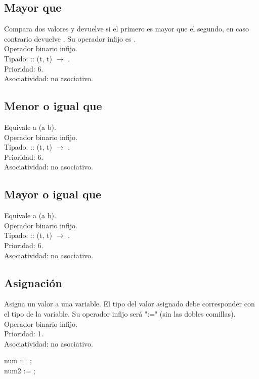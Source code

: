 \subsection*{Mayor que}
Compara dos valores y devuelve  si el primero es mayor que el segundo, en caso contrario devuelve . Su operador infijo es \Gt.
\\Operador binario infijo.
\\Tipado: \Gt :: (t, t) $\rightarrow$ \Boolean. \\Prioridad: 6.
\\Asociatividad: no asociativo.

\subsection*{Menor o igual que}
Equivale a \Not (a \Lt b). 
\\Operador binario infijo.
\\Tipado: \operator{<=} :: (t, t) $\rightarrow$ \Boolean.
\\Prioridad: 6.
\\Asociatividad: no asociativo.

\subsection*{Mayor o igual que}
Equivale a \Not (a \Gt b). 
\\Operador binario infijo.
\\Tipado: \operator{>=} :: (t, t) $\rightarrow$ \Boolean.
\\Prioridad: 6.
\\Asociatividad: no asociativo.

\subsection*{Asignación}
Asigna un valor a una variable. El tipo del valor asignado debe corresponder con el tipo de la variable. Su operador infijo será ":="
(sin las dobles comillas).
\\Operador binario infijo.
\\Prioridad: 1.
\\Asociatividad: no asociativo.

\begin{algorithm}
	\Integer{} num := ;  \\
	\Integer{} num2 := ;  \\
\end{algorithm}


